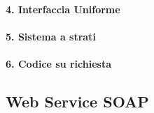 \paragraph{4. Interfaccia Uniforme}

\paragraph{5. Sistema a strati}

\paragraph{6. Codice su richiesta}

\subsection{Web Service SOAP}